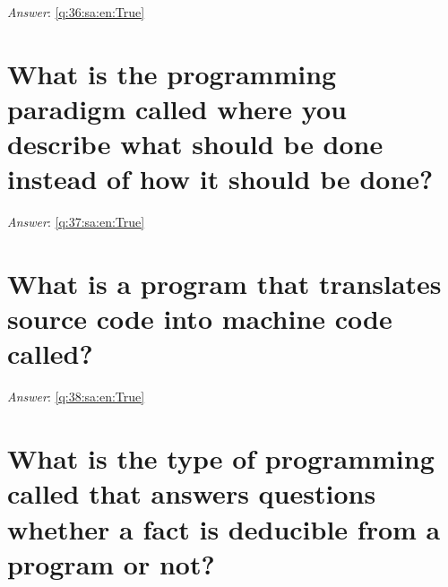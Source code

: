 \documentclass[a4paper,11pt,oneside]{book}
\begin{document}
\begin{sloppypar}
\label{q:36:sa:en:False}

\vspace{2cm}

\noindent\makebox[\textwidth]{\hrulefill}

\vspace{1cm}

\textit{Answer}: \autoref{q:36:sa:en:True}



\section{What is the programming paradigm called where you describe what should be done instead of how it should be done?}

\label{q:37:sa:en:False}

\vspace{2cm}

\noindent\makebox[\textwidth]{\hrulefill}

\vspace{1cm}

\textit{Answer}: \autoref{q:37:sa:en:True}



\section{What is a program that translates source code into machine code called?}

\label{q:38:sa:en:False}

\vspace{2cm}

\noindent\makebox[\textwidth]{\hrulefill}

\vspace{1cm}

\textit{Answer}: \autoref{q:38:sa:en:True}



\section{What is the type of programming called that answers questions whether a fact is deducible from a program or not?}

\label{q:39:sa:en:False}

\vspace{2cm}

\noindent\makebox[\textwidth]{\hrulefill}

\vspace{1cm}


\end{sloppypar}
\end{document}
